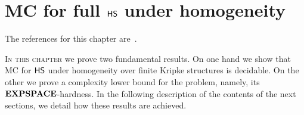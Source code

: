 \chapter{MC for full $\text{\sffamily HS}$ under homogeneity}\label{chap:MCfullHShomo}
\begin{chapref}
The references for this chapter are~\cite{MMMPP15,ijcar16,BOZZELLI2018}.
\end{chapref}

\minitoc\mtcskip

\lettrine[lines=3]{I}{n this chapter} we prove two fundamental results. On one hand we show that MC for $\text{\sffamily HS}$ under homogeneity over finite Kripke structures is decidable.
On the other we prove a complexity lower bound for the problem, namely, its $\textbf{EXPSPACE}$-hardness. In the following description of the contents of the next sections, we detail how these results are achieved.

